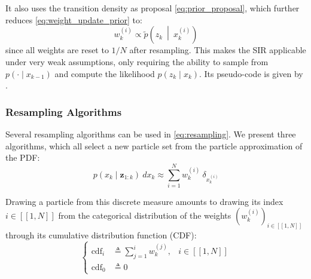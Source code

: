 It also uses the transition density as proposal \eqref{eq:prior_proposal}, which further reduces \eqref{eq:weight_update_prior} to:
\begin{equation}
	w_k^{(i)}\propto\tilde{p}\left(z_k\:\middle|\:x_k^{(i)}\right)
\end{equation}
since all weights are reset to $1/N$ after resampling. This makes the SIR applicable under very weak assumptions, only requiring the ability to sample from $p(\cdot\mid x_{k-1})$ and compute the likelihood $p(z_k\mid x_k)$. Its pseudo-code is given by .

\begin{algorithm}[!htb]
	\begin{algorithmic}
	\end{algorithmic}\caption{Sampling Importance Resampling}\label{alg:SIR}
\end{algorithm}

\subsubsection{Resampling Algorithms}

Several resampling algorithms \cite{bib:resampling-methods,bib:resampling-comparison} can be used in \eqref{eq:resampling}. We present three algorithms, which all select a new particle set from the particle approximation of the PDF:
\begin{equation}
	p(x_k\mid\mathbf{z}_{1:k})\:dx_k\approx\sum_{i=1}^Nw_k^{(i)}\:\delta_{x_k^{(i)}}
\end{equation}

Drawing a particle from this discrete measure amounts to drawing its index $i\in[\![1,N]\!]$ from the categorical distribution of the weights $\left(w_k^{(i)}\right)_{i\in[\![1,N]\!]}$ through its cumulative distribution function (CDF):
\begin{equation}
	\left\{\begin{aligned}
	\operatorname{cdf}_i&\triangleq\sum_{j=1}^i w_k^{(j)},&i\in[\![1,N]\!]\\
	\operatorname{cdf}_0&\triangleq0
	\end{aligned}\right.
\end{equation}

